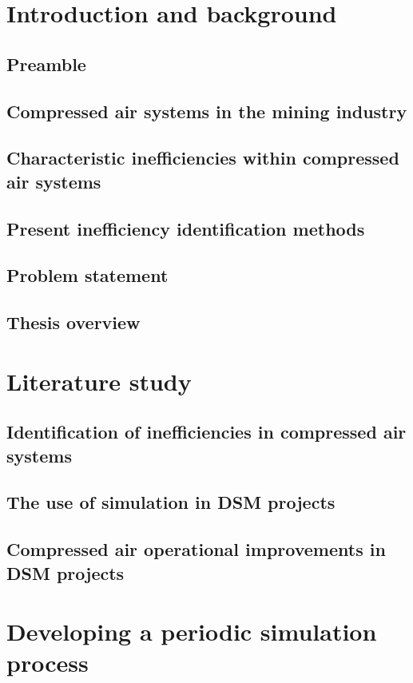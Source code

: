 \documentclass[12pt, english, oneside, singlespacing, open=any]{report}
\begin{document}
 
 
\tableofcontents
 
\chapter{Introduction and background}
\section{Preamble}
	\section{Compressed air systems in the mining industry}
	 \section{Characteristic inefficiencies within compressed air systems }
	 \section{Present inefficiency identification methods}
	 \section{Problem statement}
	 \section{Thesis overview}
 
\chapter{Literature study}
	\section{Identification of inefficiencies in compressed air systems}
	\section{The use of simulation in DSM projects}
	\section{Compressed air operational improvements in DSM projects}

\chapter{Developing a periodic simulation process}
\end{document}
